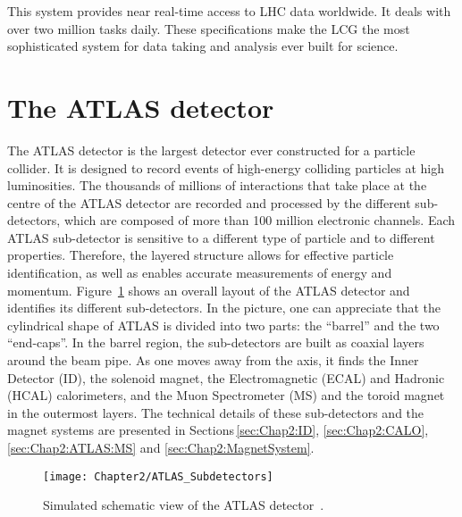 This system provides near real-time access to LHC data worldwide. %
It deals with  over two million tasks daily. These specifications make the LCG the most sophisticated system for data taking and analysis ever built for science.






\section{The ATLAS detector}
\label{sec:Chap2:ATLAS}


The ATLAS detector is the largest detector ever constructed for a particle collider. 
It is designed to record events of high-energy colliding particles at high luminosities.
The thousands of millions of interactions that take place at the centre of the ATLAS detector are recorded and processed by the
different sub-detectors, which are composed of more than 100 million electronic channels. Each ATLAS sub-detector
is sensitive to a different type of particle and to different properties. Therefore, the layered structure allows for effective particle identification, as well as  
enables accurate measurements of energy and momentum. Figure~\ref{fig:Chap2:ATLAS:GeneralOverview} shows an overall layout of the ATLAS 
detector and identifies its different sub-detectors. In the picture, one can appreciate that the cylindrical shape of ATLAS is divided into two parts: the ``barrel'' 
and the two ``end-caps''. In the barrel region, the sub-detectors are built as coaxial layers around the beam pipe. %
As one moves away from the axis, it finds the Inner Detector (ID), the solenoid magnet, the Electromagnetic (ECAL) and Hadronic (HCAL) calorimeters, and
the Muon Spectrometer (MS) and the toroid magnet in the outermost layers. 
The technical details of these sub-detectors and the magnet systems are presented in Sections\,\ref{sec:Chap2:ID}, 
\ref{sec:Chap2:CALO}, \ref{sec:Chap2:ATLAS:MS} and \ref{sec:Chap2:MagnetSystem}.

\begin{figure}
	\centering
 	 \texttt{[image: Chapter2/ATLAS\_Subdetectors]}
	 \caption{Simulated schematic view of the ATLAS detector~\cite{Pequenao:1095924}.}
	\label{fig:Chap2:ATLAS:GeneralOverview}
\end{figure}

